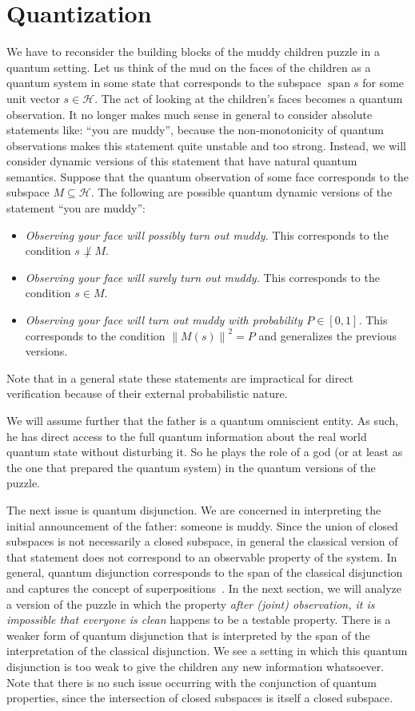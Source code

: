 \documentclass[a4paper]{article}
\newcommand{\HH}{\mathcal{H}}
\DeclareMathOperator{\spn}{span}
\newcommand{\ppar}[1]{#1}
\newcommand{\norm}[1]{\left\lVert#1\right\rVert}
\begin{document}
\section*{Quantization}
We have to reconsider the building blocks of the muddy children puzzle in a
quantum setting. Let us think of the mud on the faces of the children as a
quantum system in some state that corresponds to the subspace $\spn{s}$ for some
unit vector $s \in \HH$. The act of looking at the children's faces becomes a
quantum observation.  It no longer makes much sense in general to consider
absolute statements like: ``you are muddy'', because the non-monotonicity of
quantum observations makes this statement quite unstable and too strong.
Instead, we will consider dynamic versions of this statement that have natural
quantum semantics. Suppose that the quantum observation of some face corresponds
to the subspace $M \subseteq \HH$. The following are possible quantum dynamic 
versions of the statement ``you are muddy'':

\begin{itemize}
\item \emph{Observing your face will possibly turn out muddy.}
    This corresponds to the condition $s \not\perp M$.
\item \emph{Observing your face will surely turn out muddy.}
    This corresponds to the condition $s \in M$.
\item \emph{Observing your face will turn out muddy with probability $P \in
    [0,1]$.} 
    This corresponds to the condition $\norm{\ppar{M}(s)}^2 = P$ and generalizes
    the previous versions.
\end{itemize}
Note that in a general state these statements are impractical for direct 
verification because of their external probabilistic nature.

We will assume further that the father is a quantum omniscient entity. As such,
he has direct access to the full quantum information about the real world
quantum state without disturbing it. So he plays the role of a god (or at least
as the one that prepared the quantum system) in the quantum versions of the
puzzle.

The next issue is quantum disjunction. We are concerned in interpreting the
initial announcement of the father: someone is muddy. Since the union of closed
subspaces is not necessarily a closed subspace, in general the classical version
of that statement does not correspond to an observable property of the system.
In general, quantum disjunction corresponds to the span of the classical
disjunction and captures the concept of superpositions~\cite{wlogqm}.
In the next section, we will analyze a version of the puzzle in which the
property \emph{after (joint) observation, it is impossible that everyone is
clean} happens to be a testable property. There is a weaker form of quantum
disjunction that is interpreted by the span of the interpretation of the
classical disjunction. We see a setting in which this quantum disjunction is too
weak to give the children any new information whatsoever. Note that there is no
such issue occurring with the conjunction of quantum properties, since the
intersection of closed subspaces is itself a closed subspace.
\end{document}
